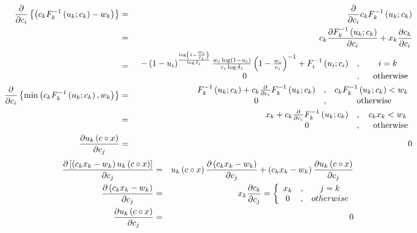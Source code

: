 \documentclass{article}
\begin{document}
\begin{eqnarray*}
\frac{\partial }{\partial c_{i}}\left\{ \left( c_{k}F_{k}^{-1}\left(
u_{k};c_{k}\right) -w_{k}\right) \right\}  &=&\frac{\partial }{\partial c_{i}%
}c_{k}F_{k}^{-1}\left( u_{k};c_{k}\right)  \\
&=&c_{k}\frac{\partial F_{k}^{-1}\left( u_{k};c_{k}\right) }{\partial c_{i}}%
+x_{k}\frac{\partial c_{k}}{\partial c_{i}} \\
&=&%
\begin{array}{ccc}
-\left( 1-u_{i}\right) ^{\frac{\log \left( 1-\frac{w_{i}}{c_{i}}\right) }{%
\log \delta _{i}}}\frac{w_{i}\log \left( 1-u_{i}\right) }{c_{i}\log \delta
_{i}}\left( 1-\frac{w_{i}}{c_{i}}\right) ^{-1}+F_{i}^{-1}\left(
u_{i};c_{i}\right)  & , & i=k \\ 
0 & , & \text{otherwise}%
\end{array}
\\
\frac{\partial }{\partial c_{i}}\left\{ \min \left( c_{k}F_{k}^{-1}\left(
u_{k};c_{k}\right) ,w_{k}\right) \right\}  &=&%
\begin{array}{ccc}
F_{k}^{-1}\left( u_{k};c_{k}\right) +c_{k}\frac{\partial }{\partial c_{i}}%
F_{k}^{-1}\left( u_{k};c_{k}\right)  & , & c_{k}F_{k}^{-1}\left(
u_{k};c_{k}\right) <w_{k} \\ 
0 & , & \text{otherwise}%
\end{array}
\\
&=&%
\begin{array}{ccc}
x_{k}+c_{k}\frac{\partial }{\partial c_{i}}F_{k}^{-1}\left(
u_{k};c_{k}\right)  & , & c_{k}x_{k}<w_{k} \\ 
0 & , & \text{otherwise}%
\end{array}
\\
\frac{\partial u_{k}\left( c\circ x\right) }{\partial c_{j}} &=&0
\end{eqnarray*}%
\begin{eqnarray*}
\frac{\partial \left[ \left( c_{k}x_{k}-w_{k}\right) u_{k}\left( c\circ
x\right) \right] }{\partial c_{j}} &=&u_{k}\left( c\circ x\right) \frac{%
\partial \left( c_{k}x_{k}-w_{k}\right) }{\partial c_{j}}+\left(
c_{k}x_{k}-w_{k}\right) \frac{\partial u_{k}\left( c\circ x\right) }{%
\partial c_{j}} \\
\frac{\partial \left( c_{k}x_{k}-w_{k}\right) }{\partial c_{j}} &=&x_{k}%
\frac{\partial c_{k}}{\partial c_{j}}=\left\{ 
\begin{array}{ccc}
x_{k} & , & j=k \\ 
0 & , & otherwise%
\end{array}%
\right.  \\
\frac{\partial u_{k}\left( c\circ x\right) }{\partial c_{j}} &=&0
\end{eqnarray*}%
\end{document}
